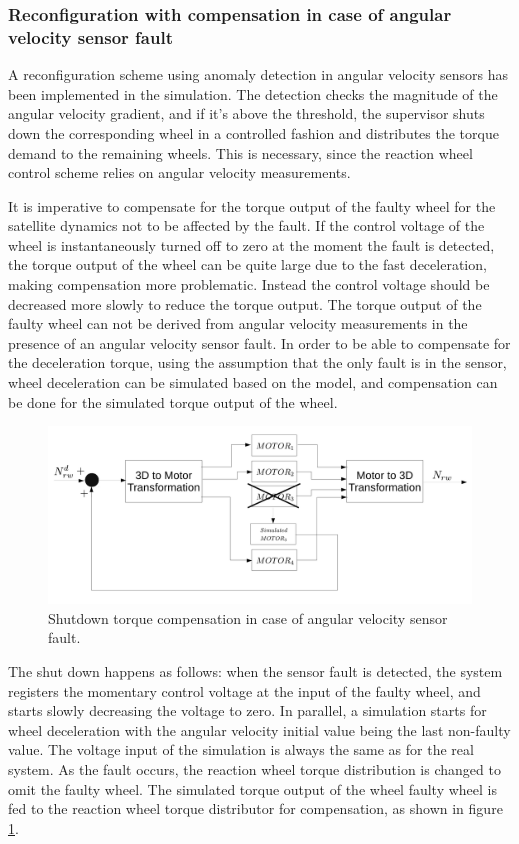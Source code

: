 \subsubsection{Reconfiguration with compensation in case of angular velocity sensor fault}



A reconfiguration scheme using anomaly detection in angular velocity sensors has been implemented in the simulation. The detection checks the magnitude of the angular velocity gradient, and if it's above the threshold, the supervisor shuts down the corresponding wheel in a controlled fashion and distributes the torque demand to the remaining wheels. This is necessary, since the reaction wheel control scheme relies on angular velocity measurements. 

It is imperative to compensate for the torque output of the faulty wheel for the satellite dynamics not to be affected by the fault. If the control voltage of the wheel is instantaneously turned off to zero at the moment the fault is detected, the torque output of the wheel can be quite large due to the fast deceleration, making compensation more problematic. Instead the control voltage should be decreased more slowly to reduce the torque output. The torque output of the faulty wheel can not be derived from angular velocity measurements in the presence of an angular velocity sensor fault. In order to be able to compensate for the deceleration torque, using the assumption that the only fault is in the sensor, wheel deceleration can be simulated based on the model, and compensation can be done for the simulated torque output of the wheel.

\begin{figure}
	\centering
	\includegraphics[width=120mm]{figures/simulatedCompensation}
	\caption{Shutdown torque compensation in case of angular velocity sensor fault.}
	\label{fig:angFaultCompensation}
\end{figure} 

The shut down happens as follows: when the sensor fault is detected, the system registers the momentary control voltage at the input of the faulty wheel, and starts slowly decreasing the voltage to zero. In parallel, a simulation starts for wheel deceleration with the angular velocity initial value being the last non-faulty value. The voltage input of the simulation is always the same as for the real system. As the fault occurs, the reaction wheel torque distribution is changed to omit the faulty wheel. The simulated torque output of the wheel faulty wheel is fed to the reaction wheel torque distributor for compensation, as shown in figure \ref{fig:angFaultCompensation}.

